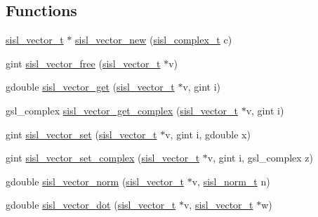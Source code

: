\subsection*{Functions}
\begin{DoxyCompactItemize}
\item 
\mbox{\hyperlink{group__vector_gacbac585492f5005f05f0c0b8463039be}{sisl\+\_\+vector\+\_\+t}} $\ast$ \mbox{\hyperlink{group__vector_ga174917724c5ef307cc9d95479e4e9a40}{sisl\+\_\+vector\+\_\+new}} (\mbox{\hyperlink{group__vector_gadbf341f8965fc86dda28912ab5f04930}{sisl\+\_\+complex\+\_\+t}} c)
\item 
gint \mbox{\hyperlink{group__vector_gafedaaf875493835c6ca30030ce1d767a}{sisl\+\_\+vector\+\_\+free}} (\mbox{\hyperlink{group__vector_gacbac585492f5005f05f0c0b8463039be}{sisl\+\_\+vector\+\_\+t}} $\ast$v)
\item 
gdouble \mbox{\hyperlink{group__vector_ga461356df443bbecc3a89173878311f31}{sisl\+\_\+vector\+\_\+get}} (\mbox{\hyperlink{group__vector_gacbac585492f5005f05f0c0b8463039be}{sisl\+\_\+vector\+\_\+t}} $\ast$v, gint i)
\item 
gsl\+\_\+complex \mbox{\hyperlink{group__vector_ga9567ba6afca899f94089827012a933bc}{sisl\+\_\+vector\+\_\+get\+\_\+complex}} (\mbox{\hyperlink{group__vector_gacbac585492f5005f05f0c0b8463039be}{sisl\+\_\+vector\+\_\+t}} $\ast$v, gint i)
\item 
gint \mbox{\hyperlink{group__vector_ga7c5252db656b8e7848ddd754bbe86bee}{sisl\+\_\+vector\+\_\+set}} (\mbox{\hyperlink{group__vector_gacbac585492f5005f05f0c0b8463039be}{sisl\+\_\+vector\+\_\+t}} $\ast$v, gint i, gdouble x)
\item 
gint \mbox{\hyperlink{group__vector_ga4a2722f50dee111ee6f03a5cf28861b1}{sisl\+\_\+vector\+\_\+set\+\_\+complex}} (\mbox{\hyperlink{group__vector_gacbac585492f5005f05f0c0b8463039be}{sisl\+\_\+vector\+\_\+t}} $\ast$v, gint i, gsl\+\_\+complex z)
\item 
gdouble \mbox{\hyperlink{group__vector_ga8275033791c371c8d30bf0abbb05f44a}{sisl\+\_\+vector\+\_\+norm}} (\mbox{\hyperlink{group__vector_gacbac585492f5005f05f0c0b8463039be}{sisl\+\_\+vector\+\_\+t}} $\ast$v, \mbox{\hyperlink{group__vector_gaea7a49b9a1aa9a12bb021ada62a55495}{sisl\+\_\+norm\+\_\+t}} n)
\item 
gdouble \mbox{\hyperlink{group__vector_ga9b8e2a9fbb00ada96f0d327da88f5c64}{sisl\+\_\+vector\+\_\+dot}} (\mbox{\hyperlink{group__vector_gacbac585492f5005f05f0c0b8463039be}{sisl\+\_\+vector\+\_\+t}} $\ast$v, \mbox{\hyperlink{group__vector_gacbac585492f5005f05f0c0b8463039be}{sisl\+\_\+vector\+\_\+t}} $\ast$w)

\end{DoxyCompactItemize}
